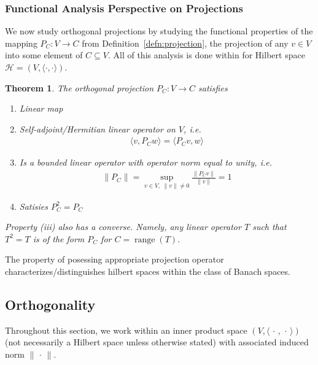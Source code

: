 \documentclass[12pt]{book}
\numberwithin{equation}{section} %
\theoremstyle{plain}
\newtheorem{thm}{Theorem}[section]
\theoremstyle{definition}
\theoremstyle{remark}
\newcommand{\ra}{\rightarrow}
\newcommand{\calH}{\mathcal{H}}
\newcommand{\range}{\operatorname{range}}
\begin{document}
\clearpage
\subsubsection{Functional Analysis Perspective on Projections}

We now study orthogonal projections by studying the functional
properties of the mapping $P_C:V\ra C$ from
Definition~\ref{defn:projection}, the projection of any $v\in V$ into
some element of $C\subseteq V$.
All of this analysis is done within for Hilbert space
$\calH=(V,\langle\cdot,\cdot\rangle)$.


\begin{thm}
The orthogonal projection $P_C:V\ra C$ satisfies
\begin{enumerate}[label=\emph{(\roman*)}]
  \item Linear map
  \item Self-adjoint/Hermitian linear operator on $V$, i.e.
    \begin{align*}
      \langle v,P_Cw\rangle = \langle P_Cv,w\rangle
    \end{align*}

  \item Is a bounded linear operator with operator norm equal to
    unity, i.e.
    \begin{align*}
      \lVert P_C\rVert
      =
      \sup_{v \in V,\;\lVert v\rVert\neq 0}
      \frac{\lVert P_Cv\rVert}{\lVert v\rVert}
      =
      1
    \end{align*}

  \item Satisies $P_C^2=P_C$
\end{enumerate}
Property (iii) also has a converse.
Namely, any linear operator $T$ such that $T^2=T$ is of the form $P_C$
for $C=\range(T)$.
\end{thm}

The property of posessing appropriate projection operator
characterizes/distinguishes hilbert spaces within the class of Banach
spaces.




\clearpage
\subsection{Orthogonality}

Throughout this section, we work within an inner product space
$(V,\langle\,\cdot\,,\,\cdot\,\rangle)$ (not necessarily a Hilbert space
unless otherwise stated) with associated induced norm
$\lVert \,\cdot\,\rVert$.
\end{document}
